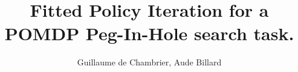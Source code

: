 \documentclass[final,3p,times,twocolumn]{elsarticle}
\begin{document}
\begin{frontmatter}



\title{Fitted Policy Iteration for a POMDP Peg-In-Hole search task.}


\author{Guillaume de Chambrier, Aude Billard}

\address{}




\begin{abstract}



\end{abstract}
\end{frontmatter}
\end{document}
